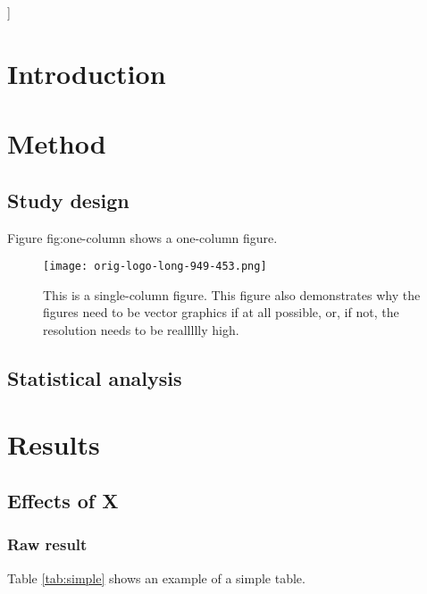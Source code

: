\documentclass[paper=a4,fontsize=11pt,twocolumn]{article}
\begin{document}
\vspace{8mm}
] %


\section{Introduction}
\lipsum[1-7]

\section{Method}
\subsection{Study design}
Figure fig:one-column shows a one-column figure.

\begin{figure}
\centering
\texttt{[image: orig-logo-long-949-453.png]}
\caption{This is a single-column figure. This figure also demonstrates why the figures need to be vector graphics if at all possible, or, if not, the resolution needs to be reallllly high.}
\label{fig:one-column}
\end{figure}

\lipsum[8-9]

\subsection{Statistical analysis}
\lipsum[10-11]

\section{Results}
\subsection{Effects of X}
\subsubsection{Raw result}

Table \ref{tab:simple} shows an example of a simple table.
\end{document}
